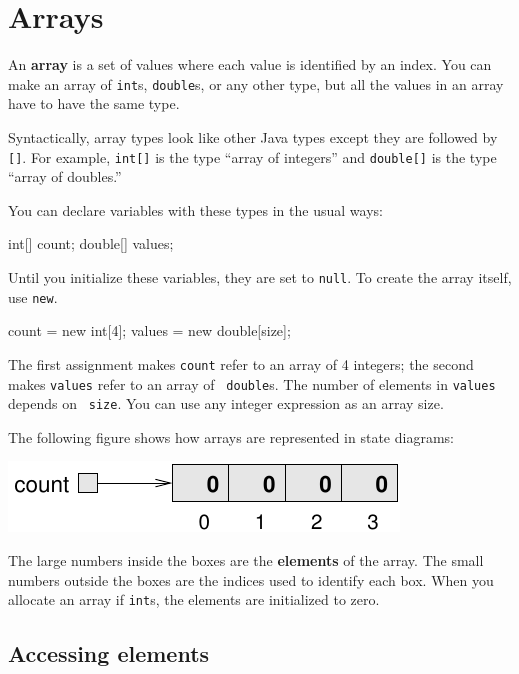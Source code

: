 \chapter{Arrays}
\label{chap10}
\label{arrays}

An {\bf array} is a set of values where each value is identified by an
index.  You can make an array of {\tt int}s, {\tt double}s, or any
other type, but all the values in an array have to have the same type.

Syntactically, array types look like other Java types except they are
followed by {\tt []}.  For example, {\tt int[]} is the type ``array of
integers'' and {\tt double[]} is the type ``array of doubles.''

You can declare variables with these types in the usual ways:

\begin{code}
    int[] count;
    double[] values;
\end{code}

Until you initialize these variables, they are set to {\tt null}.
To create the array itself, use {\tt new}.

\begin{code}
    count = new int[4];
    values = new double[size];
\end{code}

The first assignment makes {\tt count} refer to an array of 4
integers; the second makes {\tt values} refer to an array of {\tt
double}s.  The number of elements in {\tt values} depends on {\tt
size}.  You can use any integer expression as an array
size.


The following figure shows how arrays are represented in state
diagrams:


\includegraphics{figs/array.pdf}


The large numbers inside the boxes are the {\bf elements} of
the array.  The small numbers outside the boxes are the
indices used to identify each box.  When you allocate an
array if {\tt int}s, the elements are initialized to zero.


\section{Accessing elements}

